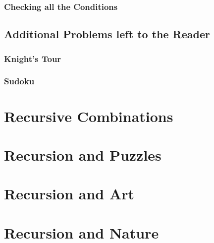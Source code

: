 \subsubsection{Checking all the Conditions}




\subsection{Additional Problems left to the Reader}

\subsubsection{Knight's Tour}

\subsubsection{Sudoku}




\section{Recursive Combinations}



\section{Recursion and Puzzles}



\section{Recursion and Art}

\section{Recursion and Nature}
